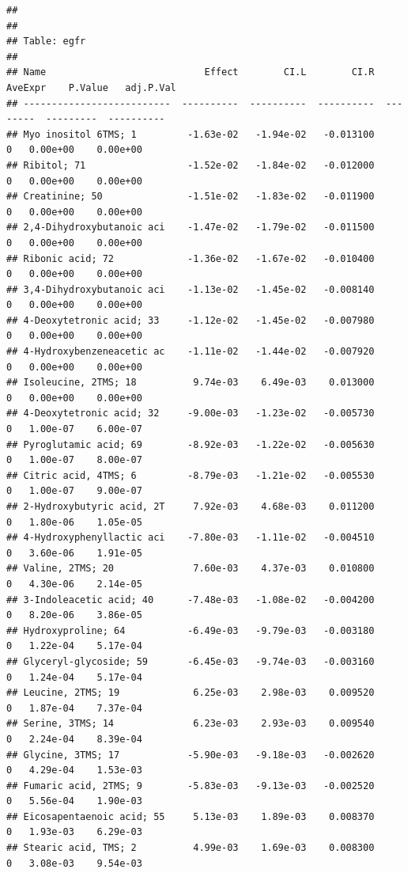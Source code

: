 \documentclass[]{article}
\begin{document}
\begin{verbatim}
## 
## 
## Table: egfr
## 
## Name                            Effect        CI.L        CI.R   AveExpr    P.Value   adj.P.Val
## --------------------------  ----------  ----------  ----------  --------  ---------  ----------
## Myo inositol 6TMS; 1         -1.63e-02   -1.94e-02   -0.013100         0   0.00e+00    0.00e+00
## Ribitol; 71                  -1.52e-02   -1.84e-02   -0.012000         0   0.00e+00    0.00e+00
## Creatinine; 50               -1.51e-02   -1.83e-02   -0.011900         0   0.00e+00    0.00e+00
## 2,4-Dihydroxybutanoic aci    -1.47e-02   -1.79e-02   -0.011500         0   0.00e+00    0.00e+00
## Ribonic acid; 72             -1.36e-02   -1.67e-02   -0.010400         0   0.00e+00    0.00e+00
## 3,4-Dihydroxybutanoic aci    -1.13e-02   -1.45e-02   -0.008140         0   0.00e+00    0.00e+00
## 4-Deoxytetronic acid; 33     -1.12e-02   -1.45e-02   -0.007980         0   0.00e+00    0.00e+00
## 4-Hydroxybenzeneacetic ac    -1.11e-02   -1.44e-02   -0.007920         0   0.00e+00    0.00e+00
## Isoleucine, 2TMS; 18          9.74e-03    6.49e-03    0.013000         0   0.00e+00    0.00e+00
## 4-Deoxytetronic acid; 32     -9.00e-03   -1.23e-02   -0.005730         0   1.00e-07    6.00e-07
## Pyroglutamic acid; 69        -8.92e-03   -1.22e-02   -0.005630         0   1.00e-07    8.00e-07
## Citric acid, 4TMS; 6         -8.79e-03   -1.21e-02   -0.005530         0   1.00e-07    9.00e-07
## 2-Hydroxybutyric acid, 2T     7.92e-03    4.68e-03    0.011200         0   1.80e-06    1.05e-05
## 4-Hydroxyphenyllactic aci    -7.80e-03   -1.11e-02   -0.004510         0   3.60e-06    1.91e-05
## Valine, 2TMS; 20              7.60e-03    4.37e-03    0.010800         0   4.30e-06    2.14e-05
## 3-Indoleacetic acid; 40      -7.48e-03   -1.08e-02   -0.004200         0   8.20e-06    3.86e-05
## Hydroxyproline; 64           -6.49e-03   -9.79e-03   -0.003180         0   1.22e-04    5.17e-04
## Glyceryl-glycoside; 59       -6.45e-03   -9.74e-03   -0.003160         0   1.24e-04    5.17e-04
## Leucine, 2TMS; 19             6.25e-03    2.98e-03    0.009520         0   1.87e-04    7.37e-04
## Serine, 3TMS; 14              6.23e-03    2.93e-03    0.009540         0   2.24e-04    8.39e-04
## Glycine, 3TMS; 17            -5.90e-03   -9.18e-03   -0.002620         0   4.29e-04    1.53e-03
## Fumaric acid, 2TMS; 9        -5.83e-03   -9.13e-03   -0.002520         0   5.56e-04    1.90e-03
## Eicosapentaenoic acid; 55     5.13e-03    1.89e-03    0.008370         0   1.93e-03    6.29e-03
## Stearic acid, TMS; 2          4.99e-03    1.69e-03    0.008300         0   3.08e-03    9.54e-03

\end{verbatim}
\end{document}

